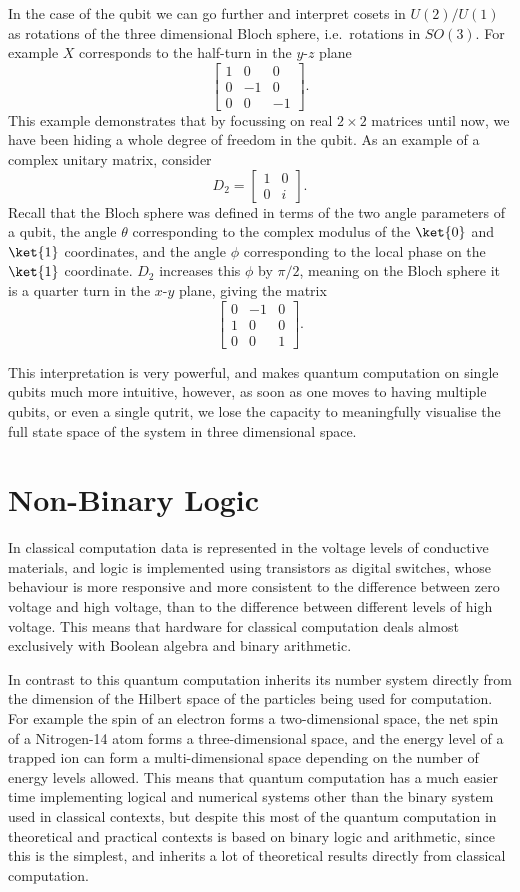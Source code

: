 In the case of the qubit we can go further and interpret cosets in $U(2)/U(1)$ as rotations of the three dimensional Bloch sphere, i.e.\ rotations in $SO(3)$. For example $X$ corresponds to the half-turn in the $y$-$z$ plane
\[\begin{bmatrix}
1 & 0 & 0 \\
0 & -1 & 0 \\
0 & 0 & -1
\end{bmatrix}.\]
This example demonstrates that by focussing on real $2 \times 2$ matrices until now, we have been hiding a whole degree of freedom in the qubit. As an example of a complex unitary matrix, consider
\[D_2 = \begin{bmatrix}
1 & 0 \\
0 & i
\end{bmatrix}.\]
Recall that the Bloch sphere was defined in terms of the two angle parameters of a qubit, the angle $\theta$ corresponding to the complex modulus of the $\ket{0}$ and $\ket{1}$ coordinates, and the angle $\phi$ corresponding to the local phase on the $\ket{1}$ coordinate. $D_2$ increases this $\phi$ by $\pi/2$, meaning on the Bloch sphere it is a quarter turn in the $x$-$y$ plane, giving the matrix
\[\begin{bmatrix}
	0 & -1 & 0 \\
	1 & 0 & 0 \\
	0 & 0 & 1
\end{bmatrix}.\]

This interpretation is very powerful, and makes quantum computation on single qubits much more intuitive, however, as soon as one moves to having multiple qubits, or even a single qutrit, we lose the capacity to meaningfully visualise the full state space of the system in three dimensional space.

\section{Non-Binary Logic}
In classical computation data is represented in the voltage levels of conductive materials, and logic is implemented using transistors as digital switches, whose behaviour is more responsive and more consistent to the difference between zero voltage and high voltage, than to the difference between different levels of high voltage. This means that hardware for classical computation deals almost exclusively with Boolean algebra and binary arithmetic.

In contrast to this quantum computation inherits its number system directly from the dimension of the Hilbert space of the particles being used for computation. For example the spin of an electron forms a two-dimensional space, the net spin of a Nitrogen-14 atom forms a three-dimensional space, and the energy level of a trapped ion can form a multi-dimensional space depending on the number of energy levels allowed. This means that quantum computation has a much easier time implementing logical and numerical systems other than the binary system used in classical contexts, but despite this most of the quantum computation in theoretical and practical contexts is based on binary logic and arithmetic, since this is the simplest, and inherits a lot of theoretical results directly from classical computation.

